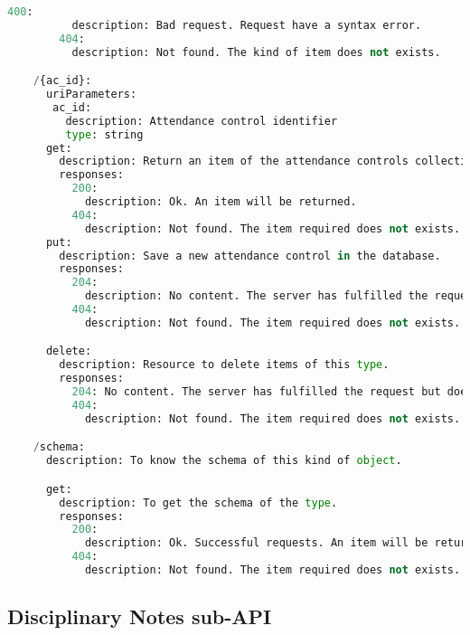 \begin{lstlisting}[language=python,frame=none]
        400:
          description: Bad request. Request have a syntax error.
        404:
          description: Not found. The kind of item does not exists.

    /{ac_id}:
      uriParameters:
       ac_id:
         description: Attendance control identifier
         type: string
      get:
        description: Return an item of the attendance controls collection.
        responses:
          200:
            description: Ok. An item will be returned.
          404:
            description: Not found. The item required does not exists.
      put:
        description: Save a new attendance control in the database.
        responses:
          204:
            description: No content. The server has fulfilled the request but does not need to return an entity-body.
          404:
            description: Not found. The item required does not exists.

      delete:
        description: Resource to delete items of this type.
        responses:
          204: No content. The server has fulfilled the request but does not need to return an entity-body.
          404:
            description: Not found. The item required does not exists.

    /schema:
      description: To know the schema of this kind of object.

      get:
        description: To get the schema of the type.
        responses:
          200:
            description: Ok. Successful requests. An item will be returned.
          404:
            description: Not found. The item required does not exists.

\end{lstlisting}

\subsection{Disciplinary Notes sub-API}

